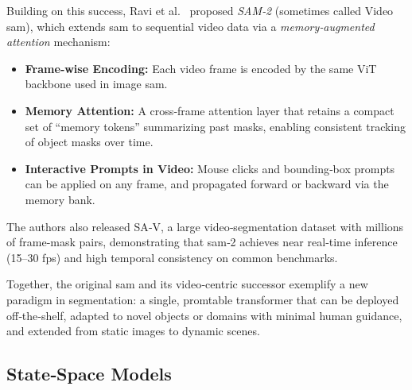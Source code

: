 Building on this success, Ravi et al.\ \cite{ravi_sam_nodate} proposed \emph{SAM‑2} (sometimes called Video \acrshort{sam}), which extends \acrshort{sam} to sequential video data via a \emph{memory‐augmented attention} mechanism:
\begin{itemize}
    \item \textbf{Frame‐wise Encoding:} Each video frame is encoded by the same ViT backbone used in image \acrshort{sam}.
    \item \textbf{Memory Attention:} A cross‐frame attention layer that retains a compact set of “memory tokens” summarizing past masks, enabling consistent tracking of object masks over time.
    \item \textbf{Interactive Prompts in Video:} Mouse clicks and bounding‐box prompts can be applied on any frame, and propagated forward or backward via the memory bank.
\end{itemize}
The authors also released SA‑V, a large video‑segmentation dataset with millions of frame‐mask pairs, demonstrating that \acrshort{sam}‑2 achieves near real‐time inference (15–30 fps) and high temporal consistency on common benchmarks.

Together, the original \acrshort{sam} and its video‐centric successor exemplify a new paradigm in segmentation: a single, promtable transformer that can be deployed off‐the‐shelf, adapted to novel objects or domains with minimal human guidance, and extended from static images to dynamic scenes. 

\subsection{State‐Space Models}
\label{ssec:state_space_models}

